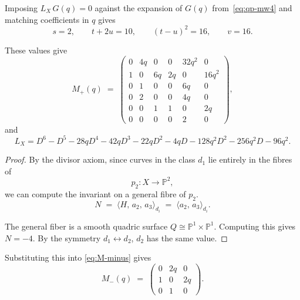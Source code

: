 \documentclass{amsart}
\newtheorem{proposition}[theorem]{Proposition}
\theoremstyle{definition}
\theoremstyle{remark}
\newtheorem{remark}[theorem]{Remark}
\newcommand{\PP}{\mathbb P}
\begin{document}
Imposing $L_X\, G(q) = 0$ against the expansion of 
$G(q)$ 
from~\eqref{eq:qp-mw4} and matching coefficients in $q$ gives
\begin{equation}\label{eq:period-system}
s = 2, \qquad t + 2u = 10, \qquad (t - u)^2 = 16, \qquad v = 16.
\end{equation}


These values give
\begin{equation}\label{eq:M-plus-resolved}
  M_+(q)
  \;=\;
  \begin{pmatrix}
    0     & 4q    & 0   & 0   & 32q^2  & 0     \\
    1     & 0     & 6q  & 2q  & 0      & 16q^2 \\
    0     & 1     & 0   & 0   & 6q     & 0     \\
    0     & 2     & 0   & 0   & 4q     & 0     \\
    0     & 0     & 1   & 1   & 0      & 2q    \\
    0     & 0     & 0   & 0   & 2      & 0
  \end{pmatrix},
\end{equation}
and 
\begin{equation*}
L_X
= D^6 - D^5
- 28q D^4
- 42q D^3
- 22q D^2
- 4q D
- 128 q^2 D^2
- 256 q^2 D
- 96 q^2.
\end{equation*}


\begin{proof}
By the divisor axiom, since curves in the class \(d_1\) lie entirely in the fibres of
\[
  p_2:X\to\mathbb P^2,
\]
we can compute the invariant on a general fibre of \(p_2\).
\[
  N
  \;=\;
  \langle H,\,a_2,\,a_3\rangle_{d_i}
  \;=\;
  \langle a_2,\,a_3\rangle_{d_i}.
\]

The general fiber is a smooth quadric surface $Q \cong \PP^1 \times \PP^1$. Computing this gives $N = -4$. By the symmetry $d_1 \leftrightarrow d_2$, $d_2$ has the same value.
\end{proof}

Substituting this into \cref{eq:M-minus} gives 
\begin{equation*}
  M_-(q)
  \;=\;
  \begin{pmatrix}
    0 & 2q & 0  \\
    1 & 0  & 2q \\
    0 & 1  & 0
  \end{pmatrix}.
\end{equation*}
\end{document}
